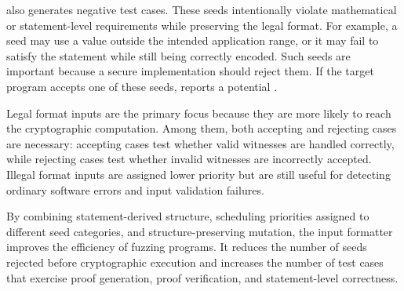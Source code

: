 \greyboxfuzz also generates negative test cases. These seeds intentionally violate mathematical or statement-level requirements while preserving the legal format. For example, a seed may use a value outside the intended application range, or it may fail to satisfy the statement while still being correctly encoded. Such seeds are important because a secure implementation should reject them. If the target program accepts one of these seeds, \greyboxfuzz reports a potential \logicerror.

Legal format inputs are the primary focus because they are more likely to reach the cryptographic computation.  Among them, both accepting and rejecting cases are necessary: accepting cases test whether valid witnesses are handled correctly, while rejecting cases test whether invalid witnesses are incorrectly accepted. Illegal format inputs are assigned lower priority but are still useful for detecting ordinary software errors and input validation failures.

By combining statement-derived structure, scheduling priorities assigned to different seed categories, and structure-preserving mutation, the input formatter improves the efficiency of fuzzing \zksnark programs. It reduces the number of seeds rejected before cryptographic execution and increases the number of test cases that exercise proof generation, proof verification, and statement-level correctness.


